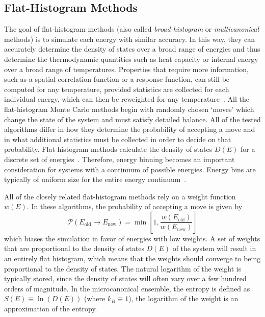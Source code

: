 \subsection{Flat-Histogram Methods}\label{fhm}
The goal of flat-histogram methods (also called \emph{broad-histogram}
or \emph{multicanonical} methods) is to simulate each energy with
similar accuracy.  In this way, they can accurately determine the density of states
over a broad range of energies and thus determine the thermodynamic
quantities such as heat capacity or internal energy
over a broad range of temperatures.
Properties that require more information, such as a spatial
correlation function or a response function, can still be computed
for any temperature, provided statistics are collected for each
individual energy, which can then be reweighted for any
temperature~\cite{panagiotopoulos1998phase, panagiotopoulos2000monte,
errington2003direct}.
All the flat-histogram Monte Carlo methods begin with randomly chosen
`moves' which change the state of the system and must satisfy
detailed balance.  All of the tested algorithms differ in how they determine the
probability of accepting a move and in what additional statistics must
be collected in order to decide on that probability.
Flat-histogram methods calculate the density of states $D(E)$ for a discrete set
of energies~\cite{wang2001determining, dayal2004performance, troyer2003flat,
trebst2004optimizing}. Therefore, energy binning becomes an important
consideration for systems with a continuum of possible energies.  Energy bins
are typically of uniform size for the entire energy
continuum~\cite{fasnacht2004adaptive}.

All of the closely related flat-histogram
methods rely on a weight function $w(E)$.  In these
algorithms, the probability of accepting a move is given by
\begin{equation}
	\mathcal{P}(E_\text{old} \rightarrow E_\text{new})
	= \min\left[1,\frac{w(E_\text{old})}{w(E_\text{new})}\right]
\end{equation}
which biases the simulation in favor of energies with low weights.  A set of
weights that are proportional to the density of states $D(E)$ of the system will
result in an entirely flat histogram, which means that the weights should
converge to being proportional to the density of states.  The natural logarithm
of the weight is typically stored, since the density of states will often vary
over a few hundred orders of magnitude. In the microcanonical ensemble, the
entropy is defined as $S(E) \equiv \ln(D(E))$ (where $k_B \equiv 1$), the
logarithm of the weight is an approximation of the entropy.

